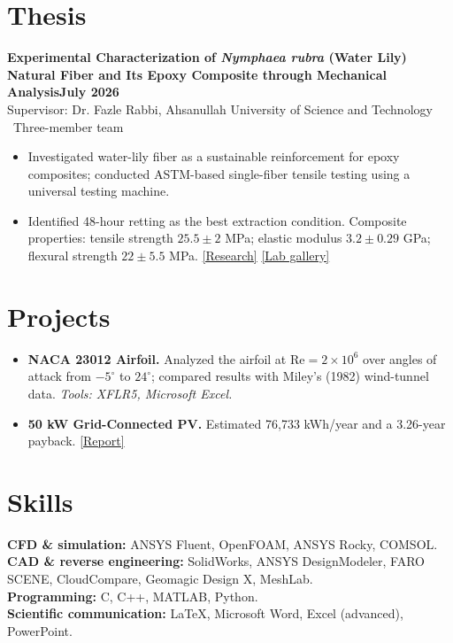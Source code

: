 \documentclass[11pt,a4paper]{article}
\newcommand{\cvlink}[2]{\href{#1}{\textnormal{\small[#2]}}}
\begin{document}
\section*{Thesis}
\textbf{Experimental Characterization of \textit{Nymphaea rubra} (Water Lily) Natural Fiber
and Its Epoxy Composite through Mechanical Analysis}\hfill\textbf{July 2026}\\
Supervisor: Dr. Fazle Rabbi, Ahsanullah University of Science and Technology \textbar\ Three-member team
\begin{itemize}
  \item Investigated water-lily fiber as a sustainable reinforcement for epoxy composites;
  conducted ASTM-based single-fiber tensile testing using a universal testing machine.
  \item Identified 48-hour retting as the best extraction condition. Composite properties:
  tensile strength \(25.5\pm2\) MPa; elastic modulus \(3.2\pm0.29\) GPa; flexural strength
  \(22\pm5.5\) MPa.
  \cvlink{https://meherabhossen.pages.dev/\#research-composites}{Research}
  \cvlink{https://meherabhossen.pages.dev/\#showcase}{Lab gallery}
\end{itemize}

\section*{Projects}
\begin{itemize}
  \item \textbf{NACA 23012 Airfoil.} Analyzed the airfoil at \(\mathrm{Re}=2\times10^{6}\) over angles
  of attack from \(-5^{\circ}\) to \(24^{\circ}\); compared results with Miley's (1982)
  wind-tunnel data. \textit{Tools: XFLR5, Microsoft Excel.}
  \item \textbf{50 kW Grid-Connected PV.} Estimated 76,733 kWh/year and a 3.26-year payback.
  \cvlink{https://meherabhossen.pages.dev/assets/files/solar-pv-net-metering.pdf}{Report}
\end{itemize}

\section*{Skills}
\textbf{CFD \& simulation:} ANSYS Fluent, OpenFOAM, ANSYS Rocky, COMSOL.\\
\textbf{CAD \& reverse engineering:} SolidWorks, ANSYS DesignModeler, FARO SCENE,
CloudCompare, Geomagic Design X, MeshLab.\\
\textbf{Programming:} C, C++, MATLAB, Python.\\
\textbf{Scientific communication:} LaTeX, Microsoft Word, Excel (advanced), PowerPoint.
\end{document}
